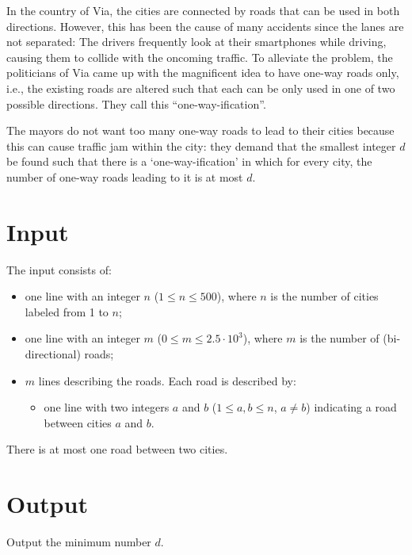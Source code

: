 \noindent
In the country of Via, the cities are connected by roads that can be used in both directions. However, this has been the cause of many accidents since the lanes are not separated: The drivers frequently look at their smartphones while driving, causing them to collide with the oncoming traffic.
To alleviate the problem, the politicians of Via came up with the magnificent idea to have one-way roads only, i.e., the existing roads are altered such that each can be only used in one of two possible directions. They call this ``one-way-ification''.

The mayors do not want too many one-way roads to lead to their cities because this can cause traffic jam within the city: they demand that the smallest integer $d$ be found such that there is a `one-way-ification' in which for every city, the number of one-way roads leading to it is at most $d$. %

\section*{Input}

The input consists of:
\begin{itemize}
\item one line with an integer $n$ ($1 \leq n \leq 500$), where $n$ is the number of cities labeled from 1 to $n$;
\item one line with an integer $m$ ($0 \leq m \leq 2.5\cdot 10^3$), where $m$ is the number of (bi-directional) roads;
\item $m$ lines describing the roads. Each road is described by:
\begin{itemize}
\item one line with two integers $a$ and $b$ ($1\leq a, b\leq n$, $a\neq b$) indicating a road between cities $a$ and $b$.
\end{itemize}
\end{itemize}

There is at most one road between two cities.

\section*{Output}
Output the minimum number $d$.

